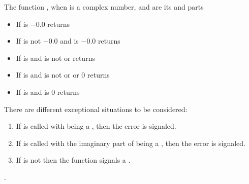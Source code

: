 \documentclass[../Exponentials-Logarithms-Trigonometry.tex]{subfiles}
\begin{document}
    \noindent
    The function , when  is a complex number, 
    and  are its  and  parts
    \begin{itemize}
        \item If  is $-0.0$ returns 
        \code{))}
        \item If  is not $-0.0$ and  is
$-0.0$ returns 
        \item If  is  and
         is not  or 
        returns \code{)))}
        \item If  is  and
         is not  or  or $0$
        returns \code{)))}
        \item If  is  and  is $0$
        returns 
    \end{itemize}

    \DExceptional{}

    There are different exceptional situations to be considered:
    \begin{enumerate}
        \item If  is called with
         being a , then the
         error is signaled.
        \item If  is called with the imaginary
        part of  being a , then the
         error is signaled.
        \item If  is not \CL{}
         then the function  signals a
        .
    \end{enumerate}

    \DSeeAlso{}

    .
\end{document}
